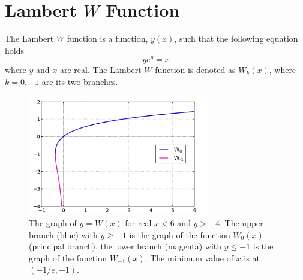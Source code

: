 \chapter{Lambert $W$ Function} \label{app:lambert-w}
\begin{definition}
    The Lambert $W$ function is a function, $y(x)$, such that the following equation holds
    \[ ye^y = x \]
    where $y$ and $x$ are real. The Lambert $W$ function is denoted as $W_k(x)$, where $k=0,-1$ are its two branches.
\end{definition}
\begin{figure} [htbp]
    \centering
    \includegraphics[width=0.7\textwidth]{figures/lambert-w.png}
    \caption{The graph of $y=W(x)$ for real $x<6$ and $y>-4$. The upper branch (blue) with $y\geq-1$ is the graph of the function $W_0(x)$ (principal branch), the lower branch (magenta) with $y\leq -1$ is the graph of the function $W_{-1}(x)$. The minimum value of $x$ is at $(-1/e,-1)$.}
    \label{fig:lambert-w}
\end{figure}